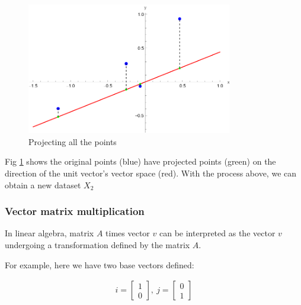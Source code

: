 \documentclass[stu,12pt,floatsintext]{apa7}
\begin{document}
\begin{figure}[h]
    \centering
    \includegraphics[width=0.8\textwidth]{images/multi-point-projection.png}
    \caption{Projecting all the points}
    \label{fig:multi-point-projection}
\end{figure}

Fig \ref{fig:multi-point-projection} shows the original points (blue) have projected points (green) on the direction of the unit vector's vector space (red). With the process above, we can obtain a new dataset $X_2$

\subsubsection{Vector matrix multiplication}
\label{sec:vector-matrix-multiplication}

In linear algebra, matrix $A$ times vector $v$ can be interpreted as the vector $v$ undergoing a transformation defined by the matrix $A$. 

For example, here we have two base vectors defined:

\begin{gather}
    \label{eq:base-definition}
    i=\begin{bmatrix}
        1 \\ 0
    \end{bmatrix},\ j=\begin{bmatrix}
        0\\1
    \end{bmatrix}
\end{gather}
\end{document}
